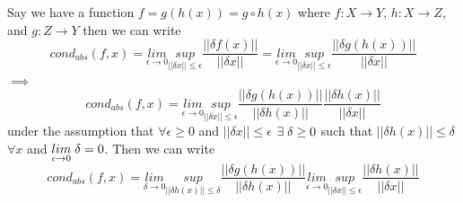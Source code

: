 Say we have a function $f=g(h(x)) = g \circ h(x)$ where $f:X\to Y$, $h:X\to Z$, and $g:Z\to Y$ then we can write
\begin{equation}
    cond_{abs}(f,x) = \underset{\epsilon \to 0}{lim}\underset{||\delta x||\le \epsilon}{sup} \frac{||\delta f(x)||}{||\delta x||} = \underset{\epsilon \to 0}{lim}\underset{||\delta x||\le \epsilon}{sup} \frac{||\delta g(h(x))||}{||\delta x||}
\end{equation}
$\implies$
\begin{equation}
    cond_{abs}(f,x) = \underset{\epsilon \to 0}{lim}\underset{||\delta x||\le \epsilon}{sup} \frac{||\delta g(h(x))||}{||\delta h(x)||}\frac{||\delta h(x)||}{||\delta x||}
\end{equation}
under the assumption that $\forall \epsilon \ge 0$ and $||\delta x||
\le \epsilon$ $\exists\hspace{1mm} \delta \ge 0$ such that $||\delta h(x)|| \le \delta$ $\forall x$ and $\underset{\epsilon \to 0}{lim}\hspace{1mm} \delta = 0$. Then we can write
\begin{equation}
    cond_{abs}(f,x) = \underset{\delta \to 0}{lim}\underset{||\delta h(x)||\le \delta}{sup} \frac{||\delta g(h(x))||}{||\delta h(x)||} \underset{\epsilon \to 0}{lim}\underset{||\delta x||\le \epsilon}{sup} \frac{||\delta h(x)||}{||\delta x||}
\end{equation}
